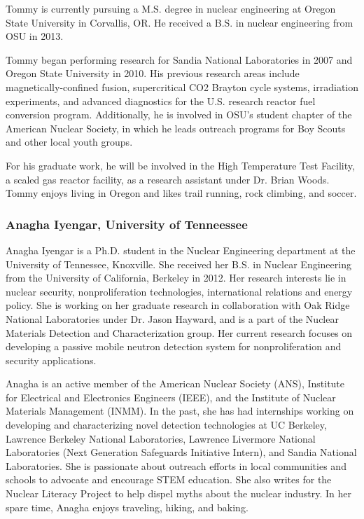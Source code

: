 Tommy is currently pursuing a M.S. degree in nuclear engineering at Oregon
State University in Corvallis, OR. He received a B.S. in nuclear engineering
from OSU in 2013.

Tommy began performing research for Sandia National Laboratories in 2007 and
Oregon State University in 2010. His previous research areas include
magnetically-confined fusion, supercritical CO2 Brayton cycle systems,
irradiation experiments, and advanced diagnostics for the U.S. research reactor
fuel conversion program. Additionally, he is involved in OSU's student chapter
of the American Nuclear Society, in which he leads outreach programs for Boy
Scouts and other local youth groups.

For his graduate work, he will be involved in the High Temperature Test
Facility, a scaled gas reactor facility, as a research assistant under Dr. Brian
Woods. Tommy enjoys living in Oregon and likes trail running, rock climbing, and
soccer.

\subsubsection*{Anagha Iyengar, University of Tenneessee}

Anagha Iyengar is a Ph.D. student in the Nuclear Engineering department at the
University of Tennessee, Knoxville. She received her B.S. in Nuclear Engineering
from the University of California, Berkeley in 2012. Her research interests lie
in nuclear security, nonproliferation technologies, international relations and
energy policy. She is working on her graduate research in collaboration with Oak
Ridge National Laboratories under Dr. Jason Hayward, and is a part of the
Nuclear Materials Detection and Characterization group. Her current research
focuses on developing a passive mobile neutron detection system for
nonproliferation and security applications.

Anagha is an active member of the American Nuclear Society (ANS), Institute for
Electrical and Electronics Engineers (IEEE), and the Institute of Nuclear
Materials Management (INMM). In the past, she has had internships working on
developing and characterizing novel detection technologies at UC Berkeley,
Lawrence Berkeley National Laboratories, Lawrence Livermore National
Laboratories (Next Generation Safeguards Initiative Intern), and Sandia National
Laboratories. She is passionate about outreach efforts in local communities and
schools to advocate and encourage STEM education. She also writes for the
Nuclear Literacy Project to help dispel myths about the nuclear industry. In her
spare time, Anagha enjoys traveling, hiking, and baking.

